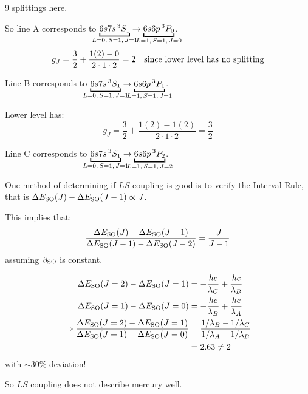 \begin{parts}
	9 splittings here.
	
	So line A corresponds to $\underbracket{6s7s\,{}^3 S_1}_{\mathclap{L=0,\, S=1,\, J=1}} \to \underbracket{6s6p\,{}^3 P_0}_{\mathclap{L=1,\, S=1,\, J=0}}$.
	\begin{equation*}
		g_J = \frac{3}{2} + \frac{1(2)-0}{2 \cdot 1 \cdot 2} = 2 \textnormal{\hspace{1em}since lower level has no splitting}
	\end{equation*}
	
	Line B corresponds to $\underbracket{6s7s\,{}^3 S_1}_{\mathclap{L=0,\, S=1,\, J=1}} \to \underbracket{6s6p\,{}^3 P_1}_{\mathclap{L=1,\, S=1,\, J=1}}$.
	
	Lower level has:
	\begin{equation*}
		g_J = \frac{3}{2} + \frac{1(2)-1(2)}{2 \cdot 1 \cdot 2} = \frac{3}{2}
	\end{equation*}
	
	Line C corresponds to $\underbracket{6s7s\,{}^3 S_1}_{\mathclap{L=0,\, S=1,\, J=1}} \to \underbracket{6s6p\,{}^3 P_2}_{\mathclap{L=1,\, S=1,\, J=2}}$.
	
	One method of determining if $LS$ coupling is good is to verify the Interval Rule, that is $\Delta E_\textnormal{SO}(J) - \Delta E_\textnormal{SO}(J-1) \propto J$.
	
	This implies that:
	\begin{equation*}
		\frac{\Delta E_\textnormal{SO}(J) - \Delta E_\textnormal{SO}(J-1)}{\Delta E_\textnormal{SO}(J-1) - \Delta E_\textnormal{SO}(J-2)} = \frac{J}{J-1}
	\end{equation*}
	assuming $\beta_\textnormal{SO}$ is constant.
	
	\begin{align*}
		\Delta E_\textnormal{SO}(J=2) - \Delta E_\textnormal{SO}(J=1) &= -\frac{hc}{\lambda_C} + \frac{hc}{\lambda_B} \\
		\Delta E_\textnormal{SO}(J=1) - \Delta E_\textnormal{SO}(J=0) &= -\frac{hc}{\lambda_B} + \frac{hc}{\lambda_A} \\
		\Rightarrow \frac{\Delta E_\textnormal{SO}(J=2) - \Delta E_\textnormal{SO}(J=1)}{\Delta E_\textnormal{SO}(J=1) - \Delta E_\textnormal{SO}(J=0)} &= \frac{1/\lambda_B - 1/\lambda_C}{1/\lambda_A - 1/\lambda_B} \\
		&= 2.63 \neq 2
	\end{align*}
	with $\sim 30\%$ deviation!
	
	So $LS$ coupling does not describe mercury well.
\end{parts}
